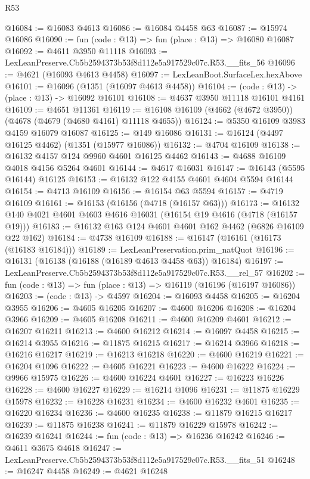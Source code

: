 \begin{lexlean}{R53}
\begin{coremodule}
@16084 := @16083 @4613
@16086 := @16084 @4458 @63
@16087 := @15974 @16086
@16090 := fun (code : @13) => fun (place : @13) => @16080 @16087
@16092 := @4611 @3950 @11118
@16093 := LexLeanPreserve.Cb5b2594373b53f8d112e5a917529c07c.R53.__fits_56
@16096 := @4621 (@16093 @4613 @4458)
@16097 := LexLeanBoot.SurfaceLex.hexAbove
@16101 := @16096 (@1351 (@16097 @4613 @4458))
@16104 := (code : @13) -> (place : @13) -> @16092 @16101
@16108 := @4637 @3950 @11118 @16101 @4161
@16109 := @4651 @11361
@16119 := @16108 @16109 (@4662 (@4672 @3950)) (@4678 (@4679 (@4680 @4161) @11118 @4655))
@16124 := @5350 @16109 @3983 @4159 @16079 @16087
@16125 := @149 @16086
@16131 := @16124 (@4497 @16125 @4462) (@1351 (@15977 @16086))
@16132 := @4704 @16109
@16138 := @16132 @4157 @124 @9960 @4601 @16125 @4462
@16143 := @4688 @16109 @4018 @4156 @5264 @4601
@16144 := @4617 @16031
@16147 := @16143 (@5595 @16144) @16125
@16153 := @16132 @122 @4155 @4601 @4604 @5594 @16144
@16154 := @4713 @16109
@16156 := @16154 @63 @5594
@16157 := @4719 @16109
@16161 := @16153 (@16156 (@4718 (@16157 @63)))
@16173 := @16132 @140 @4021 @4601 @4603 @4616 @16031 (@16154 @19 @4616 (@4718 (@16157 @19)))
@16183 := @16132 @163 @124 @4601 @4601 @162 @4462 (@6826 @16109 @22 @162)
@16184 := @4738 @16109
@16188 := @16147 (@16161 (@16173 (@16183 @16184)))
@16189 := LexLeanPreservation.prim_natQuot
@16196 := @16131 (@16138 (@16188 (@16189 @4613 @4458 @63)) @16184)
@16197 := LexLeanPreserve.Cb5b2594373b53f8d112e5a917529c07c.R53.__rel_57
@16202 := fun (code : @13) => fun (place : @13) => @16119 (@16196 (@16197 @16086))
@16203 := (code : @13) -> @4597
@16204 := @16093 @4458
@16205 := @16204 @3955
@16206 := @4605 @16205
@16207 := @4600 @16206
@16208 := @16204 @3966
@16209 := @4605 @16208
@16211 := @4600 @16209 @4601
@16212 := @16207 @16211
@16213 := @4600 @16212
@16214 := @16097 @4458
@16215 := @16214 @3955
@16216 := @11875 @16215
@16217 := @16214 @3966
@16218 := @16216 @16217
@16219 := @16213 @16218
@16220 := @4600 @16219
@16221 := @16204 @1096
@16222 := @4605 @16221
@16223 := @4600 @16222
@16224 := @9966 @15975
@16226 := @4600 @16224 @4601
@16227 := @16223 @16226
@16228 := @4600 @16227
@16229 := @16214 @1096
@16231 := @11875 @16229 @15978
@16232 := @16228 @16231
@16234 := @4600 @16232 @4601
@16235 := @16220 @16234
@16236 := @4600 @16235
@16238 := @11879 @16215 @16217
@16239 := @11875 @16238
@16241 := @11879 @16229 @15978
@16242 := @16239 @16241
@16244 := fun (code : @13) => @16236 @16242
@16246 := @4611 @3675 @4618
@16247 := LexLeanPreserve.Cb5b2594373b53f8d112e5a917529c07c.R53.__fits_51
@16248 := @16247 @4458
@16249 := @4621 @16248

\end{coremodule}
\end{lexlean}
